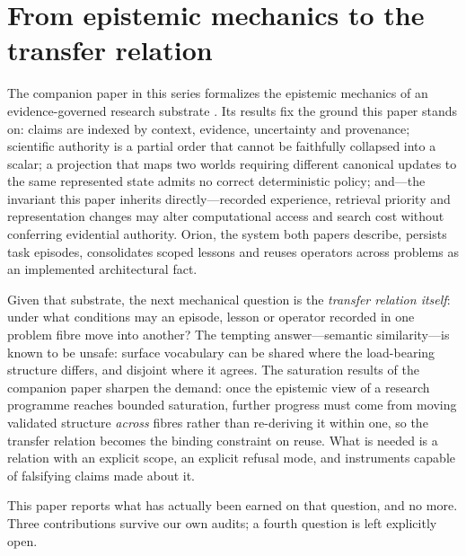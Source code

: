 \section{From epistemic mechanics to the transfer relation}

The companion paper in this series formalizes the epistemic mechanics of an evidence-governed research substrate \cite{yiu2026epistemic}. Its results fix the ground this paper stands on: claims are indexed by context, evidence, uncertainty and provenance; scientific authority is a partial order that cannot be faithfully collapsed into a scalar; a projection that maps two worlds requiring different canonical updates to the same represented state admits no correct deterministic policy; and---the invariant this paper inherits directly---recorded experience, retrieval priority and representation changes may alter computational access and search cost without conferring evidential authority. Orion, the system both papers describe, persists task episodes, consolidates scoped lessons and reuses operators across problems as an implemented architectural fact.

Given that substrate, the next mechanical question is the \emph{transfer relation itself}: under what conditions may an episode, lesson or operator recorded in one problem fibre move into another? The tempting answer---semantic similarity---is known to be unsafe: surface vocabulary can be shared where the load-bearing structure differs, and disjoint where it agrees. The saturation results of the companion paper sharpen the demand: once the epistemic view of a research programme reaches bounded saturation, further progress must come from moving validated structure \emph{across} fibres rather than re-deriving it within one, so the transfer relation becomes the binding constraint on reuse. What is needed is a relation with an explicit scope, an explicit refusal mode, and instruments capable of falsifying claims made about it.

This paper reports what has actually been earned on that question, and no more. Three contributions survive our own audits; a fourth question is left explicitly open.

